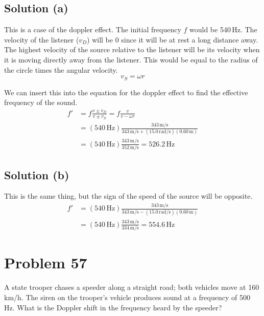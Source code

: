 \documentclass[12pt]{article}
\begin{document}
        \subsection{Solution (a)}
            This is a case of the doppler effect.
            The initial frequency $f$ would be 540\,\unit{\hertz}.
            The velocity of the listener ($v_D$) will be 0 since it will be at rest a long distance away.
            The highest velocity of the source relative to the listener will be its velocity when it is moving directly away from the listener.
            This would be equal to the radius of the circle times the angular velocity.
            \begin{equation}
                v_S =   \omega r
            \end{equation}

            We can insert this into the equation for the doppler effect to find the effective frequency of the sound.
            \begin{align}
                f'  &=  f \frac{v \pm v_D}{v \pm v_S}
                    =   f\frac{v}{v - \omega r}\\
                    &=  (540\,\unit{\hertz})\frac{343\,\unit{\meter/\second}}{343\,\unit{\meter/\second} + (15.0\,\unit{\radian/\second})(0.60\,\unit{\meter})}\\
                    &=  (540\,\unit{\hertz})\frac{343\,\unit{\meter/\second}}{352\,\unit{\meter/\second}}
                    =   \boxed{526.2\,\unit{\hertz}}
            \end{align}

        \subsection{Solution (b)}
            This is the same thing, but the sign of the speed of the source will be opposite.
            \begin{align}
                f'  &=  (540\,\unit{\hertz})\frac{343\,\unit{\meter/\second}}{343\,\unit{\meter/\second} - (15.0\,\unit{\radian/\second})(0.60\,\unit{\meter})}\\
                    &=  (540\,\unit{\hertz})\frac{343\,\unit{\meter/\second}}{334\,\unit{\meter/\second}}
                    =   \boxed{554.6\,\unit{\hertz}}
            \end{align}

    \pagebreak
    \section{Problem 57}
        A state trooper chases a speeder along a straight road; both vehicles move at 160 km/h. 
        The siren on the trooper's vehicle produces sound at a frequency of 500 Hz. 
        What is the Doppler shift in the frequency heard by the speeder?
\end{document}
